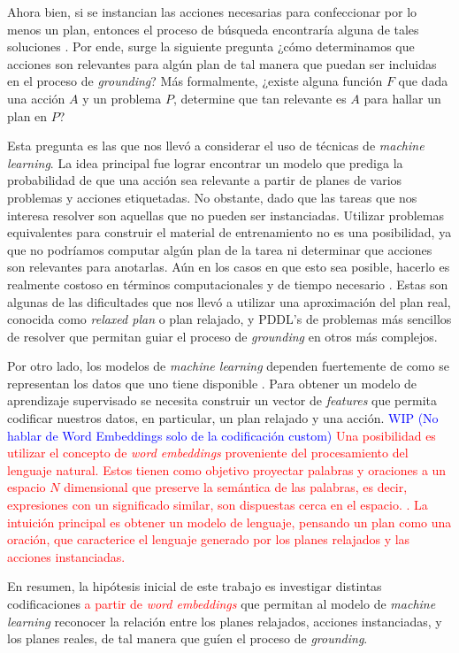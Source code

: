 Ahora bien, si se instancian las acciones necesarias para confeccionar por lo menos un plan, entonces el proceso de búsqueda encontraría alguna de tales soluciones \citep{TODO}. Por ende, surge la siguiente pregunta ¿cómo determinamos que acciones son relevantes para algún plan de tal manera que puedan ser incluidas en el proceso de \emph{grounding}? Más formalmente, ¿existe alguna función $F$ que dada una acción $A$ y un problema $P$, determine que tan relevante es $A$ para hallar un plan en $P$?

Esta pregunta es las que nos llevó a considerar el uso de técnicas de \emph{machine learning}. La idea principal fue lograr encontrar un modelo que prediga la probabilidad de que una acción sea relevante a partir de planes de varios problemas y acciones etiquetadas. No obstante, dado que las tareas que nos interesa resolver son aquellas que no pueden ser instanciadas. Utilizar problemas equivalentes para construir el material de entrenamiento no es una posibilidad, ya que no podríamos computar algún plan de la tarea ni determinar que acciones son relevantes para anotarlas. Aún en los casos en que esto sea posible, hacerlo es realmente costoso en términos computacionales y de tiempo necesario \citep{?}. Estas son algunas de las dificultades que nos llevó a utilizar una aproximación del plan real, conocida como \emph{relaxed plan} o plan relajado, y PDDL's de problemas más sencillos de resolver que permitan guiar el proceso de \emph{grounding} en otros más complejos.

Por otro lado, los modelos de \emph{machine learning} dependen fuertemente de como se representan los datos que uno tiene disponible \citep{Heaton-2016-AnEA}. Para obtener un modelo de aprendizaje supervisado se necesita construir un vector de \emph{features} que permita codificar nuestros datos, en particular, un plan relajado y una acción. \textcolor{blue}{WIP (No hablar de Word Embeddings solo de la codificación custom)}\textcolor{red}{ Una posibilidad es utilizar el concepto de \emph{word embeddings} proveniente del procesamiento del lenguaje natural. Estos tienen como objetivo proyectar palabras y oraciones a un espacio $N$ dimensional que preserve la semántica de las palabras, es decir, expresiones con un significado similar, son dispuestas cerca en el espacio. \citep{Mikolov-Ilya-Kai-Greg-Jeffrey-2013, Pennington-Jeffrey-Socher-Richard-Manning-Christopher-2014, Bojanowski-Grave-Joulin-Mikolov-2016}.
La intuición principal es obtener un modelo de lenguaje, pensando un plan como una oración, que caracterice el lenguaje generado por los planes relajados y las acciones instanciadas.}

En resumen, la hipótesis inicial de este trabajo es investigar distintas codificaciones \textcolor{red}{a partir de \emph{word embeddings}} que permitan al modelo de \emph{machine learning} reconocer la relación entre los planes relajados, acciones instanciadas, y los planes reales, de tal manera que guíen el proceso de \emph{grounding}.